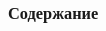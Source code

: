 \begin{frame}
	\frametitle{Содержание} 
	\begin{multicols}{2}
    \tableofcontents
    \end{multicols}
\end{frame}